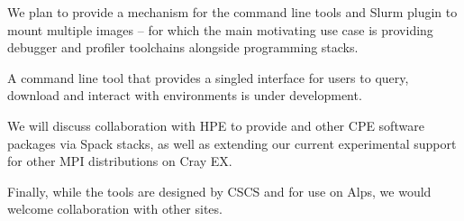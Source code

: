 We plan to provide a mechanism for the command line tools and Slurm plugin to mount multiple images -- for which the main motivating use case is providing debugger and profiler toolchains alongside programming stacks.

A command line tool that provides a singled interface for users to query, download and interact with environments is under development.

We will discuss collaboration with HPE to provide \craympich and other CPE software packages via Spack stacks, as well as extending our current experimental support for other MPI distributions on Cray EX.

Finally, while the tools are designed by CSCS and for use on Alps, we would welcome collaboration with other sites.


%        

%        
%        
%        

